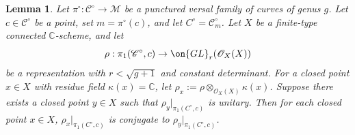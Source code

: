 \documentclass[12 pt]{amsart}
\theoremstyle{plain}
\newtheorem{lemma}[subsubsection]{Lemma}
\theoremstyle{definition}
\theoremstyle{remark}
\numberwithin{equation}{section}
\begin{document}
\begin{lemma}\label{lemma:global-rigidity}
Let $\pi^\circ: \mathscr{C}^\circ\to \mathscr{M}$ be a punctured versal family
of curves of genus $g$. Let $c\in \mathscr{C}^\circ$ be a point, set
$m=\pi^\circ(c)$, and let $C^\circ=\mathscr{C}^\circ_m$. Let $X$ be a
finite-type connected $\mathbb{C}$-scheme, and let $$\rho:
\pi_1(\mathscr{C}^\circ, c)\to \on{GL}_r(\mathscr{O}_X(X))$$ be a representation
with $r<\sqrt{g+1}$ and constant determinant. For a closed point $x\in X$ with residue field
$\kappa(x)=\mathbb{C}$, let $\rho_x:=\rho\otimes_{\mathscr{O}_X(X)}\kappa(x)$.
Suppose there exists a closed point $y\in X$ such that $\rho_y|_{\pi_1(C^\circ,
c)}$ is unitary. Then for each
closed point $x\in X$, $\rho_{x}|_{\pi_1(C^\circ, c)}$ is conjugate to $\rho_y|_{\pi_1(C^\circ, c)}$.
\end{lemma}
\end{document}
